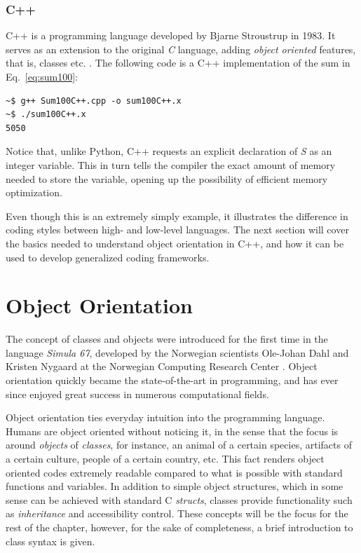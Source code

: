 \subsubsection{C++}

C++ is a programming language developed by Bjarne Stroustrup in 1983. It serves as an extension to the original \textit{C} language, adding \textit{object oriented} features, that is, classes etc. \cite{ORegan}. The following code is a C++ implementation of the sum in Eq.~\ref{eq:sum100}:

\vspace{0.5 cm}


\begin{verbatim}
~$ g++ Sum100C++.cpp -o sum100C++.x
~$ ./sum100C++.x 
5050
\end{verbatim}


Notice that, unlike Python, C++ requests an explicit declaration of \textit{S} as an integer variable. This in turn tells the compiler the exact amount of memory needed to store the variable, opening up the possibility of efficient memory optimization. 

Even though this is an extremely simply example, it illustrates the difference in coding styles between high- and low-level languages. The next section will cover the basics needed to understand object orientation in C++, and how it can be used to develop generalized coding frameworks.

\section{Object Orientation}
\label{sec:OO}

The concept of classes and objects were introduced for the first time in the language \textit{Simula 67}, developed by the Norwegian scientists Ole-Johan Dahl and Kristen Nygaard at the Norwegian Computing Research Center \cite{ORegan}. Object orientation quickly became the state-of-the-art in programming, and has ever since enjoyed great success in numerous computational fields. 

Object orientation ties everyday intuition into the programming language. Humans are object oriented without noticing it, in the sense that the focus is around \textit{objects} of \textit{classes}, for instance, an animal of a certain species, artifacts of a certain culture, people of a certain country, etc. This fact renders object oriented codes extremely readable compared to what is possible with standard functions and variables. In addition to simple object structures, which in some sense can be achieved with standard C \textit{structs}, classes provide functionality such as \textit{inheritance} and accessibility control. These concepts will be the focus for the rest of the chapter, however, for the sake of completeness, a brief introduction to class syntax is given.

